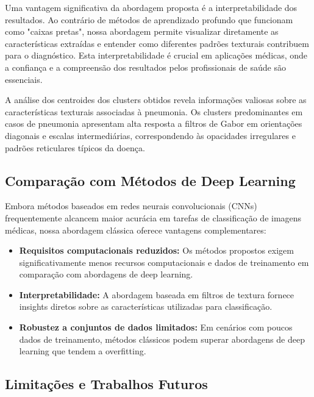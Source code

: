 \documentclass[sigconf,nonacm]{acmart}
\begin{document}
Uma vantagem significativa da abordagem proposta é a interpretabilidade dos resultados. Ao contrário de métodos de aprendizado profundo que funcionam como "caixas pretas", nossa abordagem permite visualizar diretamente as características extraídas e entender como diferentes padrões texturais contribuem para o diagnóstico. Esta interpretabilidade é crucial em aplicações médicas, onde a confiança e a compreensão dos resultados pelos profissionais de saúde são essenciais.

A análise dos centroides dos clusters obtidos revela informações valiosas sobre as características texturais associadas à pneumonia. Os clusters predominantes em casos de pneumonia apresentam alta resposta a filtros de Gabor em orientações diagonais e escalas intermediárias, correspondendo às opacidades irregulares e padrões reticulares típicos da doença.

\subsection{Comparação com Métodos de Deep Learning}

Embora métodos baseados em redes neurais convolucionais (CNNs) frequentemente alcancem maior acurácia em tarefas de classificação de imagens médicas, nossa abordagem clássica oferece vantagens complementares:

\begin{itemize}
  \item \textbf{Requisitos computacionais reduzidos:} Os métodos propostos exigem significativamente menos recursos computacionais e dados de treinamento em comparação com abordagens de deep learning.
  \item \textbf{Interpretabilidade:} A abordagem baseada em filtros de textura fornece insights diretos sobre as características utilizadas para classificação.
  \item \textbf{Robustez a conjuntos de dados limitados:} Em cenários com poucos dados de treinamento, métodos clássicos podem superar abordagens de deep learning que tendem a overfitting.
\end{itemize}

\subsection{Limitações e Trabalhos Futuros}
\end{document}
